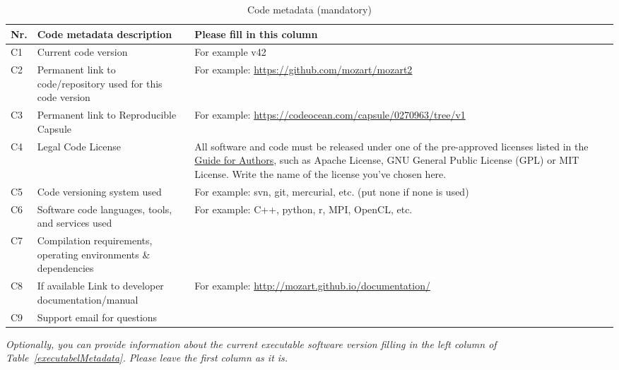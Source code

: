 \documentclass[preprint,12pt, a4paper]{elsarticle}
\begin{document}
\begin{table}[!h]
\begin{tabular}{|l|p{6.5cm}|p{6.5cm}|}
\hline
\textbf{Nr.} & \textbf{Code metadata description} & \textbf{Please fill in this column} \\
\hline
C1 & Current code version & For example v42 \\
\hline
C2 & Permanent link to code/repository used for this code version & For example: \url{https://github.com/mozart/mozart2} \\
\hline
C3  & Permanent link to Reproducible Capsule & For example: \url{https://codeocean.com/capsule/0270963/tree/v1}\\
\hline
C4 & Legal Code License   & All software and code must be released under one of the pre-approved licenses listed in the \href{https://www.elsevier.com/journals/softwarex/2352-7110/guide-for-authors}{Guide for Authors}, such as Apache License, GNU General Public License (GPL) or MIT License. Write the name of the license you’ve chosen here. \\
\hline
C5 & Code versioning system used & For example: svn, git, mercurial,
                                   etc. (put none if none is used) \\
\hline
C6 & Software code languages, tools, and services used & For example: C++, python, r, MPI, OpenCL, etc. \\
\hline
C7 & Compilation requirements, operating environments \& dependencies & \\
\hline
C8 & If available Link to developer documentation/manual & For example: \url{http://mozart.github.io/documentation/} \\
\hline
C9 & Support email for questions & \\
\hline
\end{tabular}
\caption{Code metadata (mandatory)}
\label{codeMetadata}
\end{table}

\textit{Optionally, you can provide information about the current executable
software version filling in the left column of
Table~\ref{executabelMetadata}. Please leave the first column as it is.}
\end{document}
